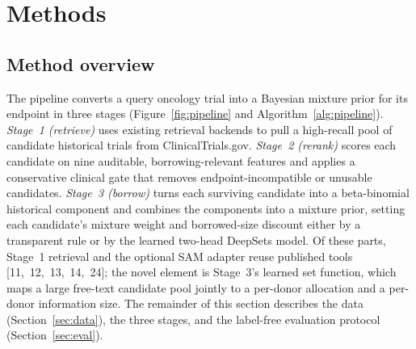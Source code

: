\documentclass[11pt]{article}
\begin{document}
\section{Methods}

\subsection{Method overview}
\label{sec:overview}
The pipeline converts a query oncology trial into a Bayesian mixture prior for
its endpoint in three stages (Figure~\ref{fig:pipeline} and
Algorithm~\ref{alg:pipeline}). \emph{Stage~1 (retrieve)} uses existing retrieval
backends to pull a high-recall pool of candidate historical trials from
ClinicalTrials.gov. \emph{Stage~2 (rerank)} scores each candidate on nine
auditable, borrowing-relevant features and applies a conservative clinical gate
that removes endpoint-incompatible or unusable candidates. \emph{Stage~3
(borrow)} turns each surviving candidate into a beta-binomial historical
component and combines the components into a mixture prior, setting each
candidate's mixture weight and borrowed-size discount either by a
transparent rule or by the learned two-head DeepSets model. Of these parts,
Stage~1 retrieval and the optional SAM adapter reuse published tools
[11,~12,~13,~14,~24]; the novel element is Stage~3's learned set function, which
maps a large free-text candidate pool jointly to a per-donor allocation and a
per-donor information size. The remainder of this section describes the data
(Section~\ref{sec:data}), the three stages, and the label-free evaluation
protocol (Section~\ref{sec:eval}).
\end{document}

